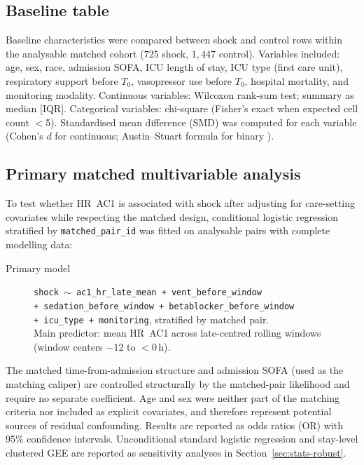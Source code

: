 \documentclass[referee,lineno,pdflatex]{sn-article-template/sn-jnl}
\begin{document}
\subsection{Baseline table}
\label{sec:stats-table1}

Baseline characteristics were compared between shock and control rows within the
analysable matched cohort ($725$ shock, $1{,}447$ control).
Variables included: age, sex, race, admission SOFA, ICU length of stay, ICU type
(first care unit), respiratory support before $T_0$, vasopressor use before
$T_0$, hospital mortality, and monitoring modality.
Continuous variables: Wilcoxon rank-sum test; summary as median [IQR].
Categorical variables: chi-square (Fisher's exact when expected cell count $<$5).
Standardised mean difference (SMD) was computed for each variable
(Cohen's $d$ for continuous; Austin--Stuart formula for binary \cite{austin2015}).

\subsection{Primary matched multivariable analysis}
\label{sec:stats-model}

To test whether HR~AC1 is associated with shock after adjusting for
care-setting covariates while respecting the matched design, conditional logistic
regression stratified by \texttt{matched\_pair\_id} was fitted on analysable pairs with
complete modelling data:
\begin{description}
  \item[Primary model] \texttt{shock $\sim$ ac1\_hr\_late\_mean + vent\_before\_window}\\
    \texttt{+ sedation\_before\_window + betablocker\_before\_window}\\
    \texttt{+ icu\_type + monitoring},
    stratified by matched pair.\\
    Main predictor: mean HR~AC1 across late-centred rolling windows
    (window centers $-12$ to $<0$\,h).
\end{description}
The matched time-from-admission structure and admission SOFA (used as the matching
caliper) are controlled structurally by the matched-pair likelihood and require no
separate coefficient.
Age and sex were neither part of the matching criteria nor included as explicit
covariates, and therefore represent potential sources of residual confounding.
Results are reported as odds ratios (OR) with 95\% confidence intervals.
Unconditional standard logistic regression and stay-level clustered GEE are reported
as sensitivity analyses in Section~\ref{sec:stats-robust}.
\end{document}
